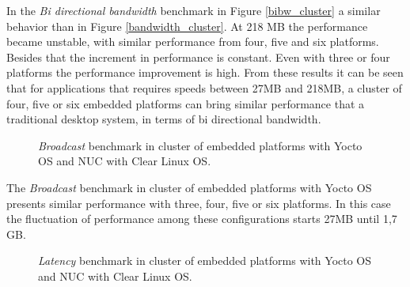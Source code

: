 In the \textit{Bi directional bandwidth} benchmark in Figure \ref{bibw_cluster}
a similar behavior than in Figure \ref{bandwidth_cluster}.  At 218 MB the
performance became unstable, with similar performance from four, five and six
platforms. Besides that the increment in performance is constant. Even with
three or four platforms the performance improvement is high. From these results
it can be seen that for applications that requires speeds between 27MB and
218MB, a cluster of four, five or six embedded platforms can bring similar
performance that a traditional desktop system, in terms of bi directional
bandwidth.

\begin{figure}[H]
\begin{center}
\end{center}
\caption{\textit{Broadcast} benchmark in cluster of embedded platforms with Yocto OS and NUC
with Clear Linux OS.}
\label{broadcast_cluster}
\end{figure}

The \textit{Broadcast} benchmark in cluster of embedded platforms with Yocto OS
presents similar performance with three, four, five or six platforms. In this
case the fluctuation of performance among these configurations starts 27MB
until 1,7 GB.

\begin{figure}[H]
\begin{center}
\end{center}
\caption{\textit{Latency} benchmark in cluster of embedded platforms with Yocto OS and NUC
with Clear Linux OS.}
\label{latency_cluster}
\end{figure}

